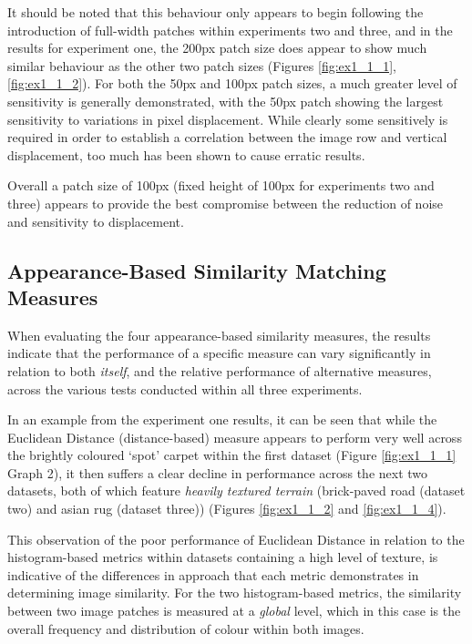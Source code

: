 It should be noted that this behaviour only appears to begin following the introduction of full-width patches within experiments two and three, and in the results for experiment one, the 200px patch size does appear to show much similar behaviour as the other two patch sizes (Figures \ref{fig:ex1_1_1}, \ref{fig:ex1_1_2}). For both the 50px and 100px patch sizes, a much greater level of sensitivity is generally demonstrated, with the 50px patch showing the largest sensitivity to variations in pixel displacement. While clearly some sensitively is required in order to establish a correlation between the image row and vertical displacement, too much has been shown to cause erratic results.

Overall a patch size of 100px (fixed height of 100px for experiments two and three) appears to provide the best compromise between the reduction of noise and sensitivity to displacement.

\subsection{Appearance-Based Similarity Matching Measures}

When evaluating the four appearance-based similarity measures, the results indicate that the performance of a specific measure can vary significantly in relation to both \textit{itself}, and the relative performance of alternative measures, across the various tests conducted within all three experiments. 

In an example from the experiment one results, it can be seen that while the Euclidean Distance (distance-based) measure appears to perform very well across the brightly coloured `spot' carpet within the first dataset (Figure \ref{fig:ex1_1_1} Graph 2), it then suffers a clear decline in performance across the next two datasets, both of which feature \textit{heavily textured terrain} (brick-paved road (dataset two) and asian rug (dataset three)) (Figures \ref{fig:ex1_1_2} and \ref{fig:ex1_1_4}). 

This observation of the poor performance of Euclidean Distance in relation to the histogram-based metrics within datasets containing a high level of texture, is indicative of the differences in approach that each metric demonstrates in determining image similarity. For the two histogram-based metrics, the similarity between two image patches is measured at a \textit{global} level, which in this case is the overall frequency and distribution of colour within both images. 

